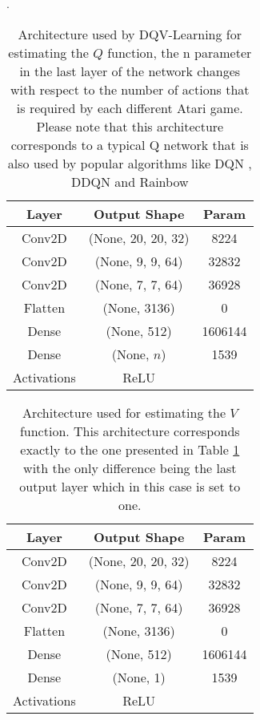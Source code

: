 \begin{table}[ht!]
\centering
\caption{Architecture used by DQV-Learning for estimating the $Q$ function, the n parameter in the last layer of the network changes with respect to the number of actions that is required by each different Atari game. Please note that this architecture corresponds to a typical Q network that is also used by popular algorithms like DQN \cite{mnih2015human}, DDQN \cite{van2015deep} and Rainbow \cite{hessel2018rainbow}}.
\begin{tabular}{c | c | c | }
Layer & Output Shape & Param \\
\hline \hline 
Conv2D & (None, 20, 20, 32) & 8224 \\     
Conv2D & (None, 9, 9, 64) & 32832 \\ 
Conv2D & (None, 7, 7, 64)  & 36928 \\ 
Flatten & (None, 3136) & 0 \\
Dense & (None, 512) & 1606144 \\
Dense & (None, $n$) & 1539 \\
Activations & ReLU & \\

\end{tabular}
\label{tab:table_2}
\end{table}

\begin{table}[ht!]
\centering
\caption{Architecture used for estimating the $V$ function. This architecture corresponds exactly to the one presented in Table \ref{tab:table_2} with the only difference being the last output layer which in this case is set to one.}
\begin{tabular}{c | c | c | }
Layer & Output Shape & Param \\
\hline \hline 
Conv2D & (None, 20, 20, 32) & 8224 \\     
Conv2D & (None, 9, 9, 64) & 32832 \\ 
Conv2D & (None, 7, 7, 64)  & 36928 \\ 
Flatten & (None, 3136) & 0 \\
Dense & (None, 512) & 1606144 \\
Dense & (None, 1) & 1539 \\
Activations & ReLU & \\

\end{tabular}
\label{tab:table_3}
\end{table}





